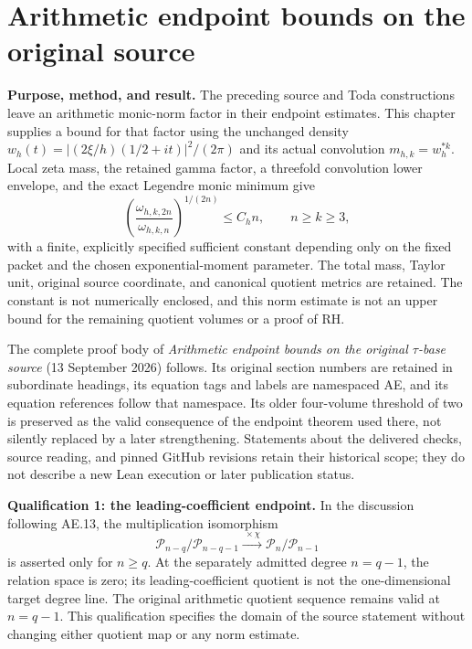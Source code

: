 \section{Arithmetic endpoint bounds on the original source}
\label{AE.chapter}

\textbf{Purpose, method, and result.}
The preceding source and Toda constructions leave an arithmetic monic-norm
factor in their endpoint estimates. This chapter supplies a bound for that
factor using the unchanged density
\(w_h(t)=|(2\xi/h)(1/2+it)|^2/(2\pi)\) and its actual convolution
\(m_{h,k}=w_h^{*k}\). Local zeta mass, the retained gamma factor, a
threefold convolution lower envelope, and the exact Legendre monic minimum
give
\[
\left(\frac{\omega_{h,k,2n}}{\omega_{h,k,n}}\right)^{1/(2n)}
\le C_h n,\qquad n\ge k\ge3,
\]
with a finite, explicitly specified sufficient constant depending only on
the fixed packet and the chosen exponential-moment parameter. The total
mass, Taylor unit, original source coordinate, and canonical quotient
metrics are retained. The constant is not numerically enclosed, and this
norm estimate is not an upper bound for the remaining quotient volumes or
a proof of RH.

The complete proof body of \emph{Arithmetic endpoint bounds on the
original $\tau$-base source} (13 September 2026) follows. Its original
section numbers are retained in subordinate headings, its equation tags
and labels are namespaced AE, and its equation references follow that
namespace. Its older four-volume threshold of two is preserved as the
valid consequence of the endpoint theorem used there, not silently
replaced by a later strengthening. Statements about the delivered
checks, source reading, and pinned GitHub revisions retain their
historical scope; they do not describe a new Lean execution or later
publication status.

\textbf{Qualification 1: the leading-coefficient endpoint.}
In the discussion following AE.13, the multiplication isomorphism
\[
\mathcal P_{n-q}/\mathcal P_{n-q-1}
\xrightarrow{\ \times\chi\ }
\mathcal P_n/\mathcal P_{n-1}
\]
is asserted only for \(n\ge q\). At the separately admitted degree
\(n=q-1\), the relation space is zero; its leading-coefficient quotient
is not the one-dimensional target degree line. The original arithmetic
quotient sequence remains valid at \(n=q-1\). This qualification
specifies the domain of the source statement without changing either
quotient map or any norm estimate.

